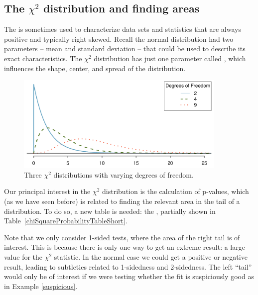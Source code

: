 \subsection{The $\chi^2$ distribution and finding areas}

The  is sometimes used to characterize data sets and statistics that are always positive and typically right skewed. Recall the normal distribution had two parameters -- mean and standard deviation -- that could be used to describe its exact characteristics. The $\chi^2$ distribution has just one parameter called , which influences the shape, center, and spread of the distribution.


\begin{figure}%
\centering
\includegraphics[width=0.9\textwidth]{ch_inference_for_props/figures/chiSquareDistributionWithInceasingDF/chiSquareDistributionWithInceasingDF}
\caption{Three $\chi^2$ distributions with varying degrees of freedom.}
\label{chiSquareDistributionWithInceasingDF}
\end{figure}


Our principal interest in the $\chi^2$ distribution is the calculation of p-values, which (as we have seen before) is related to finding the relevant area in the tail of a distribution. To do so, a new table is needed: the , partially shown in Table~\ref{chiSquareProbabilityTableShort}.

Note that we only consider 1-sided tests, where the area of the right tail is of interest. This is because there is only one way to get an extreme result: a large value for the $\chi^2$ statistic. In the normal case we could get a positive or negative result, leading to subtleties related to 1-sidedness and 2-sidedness. The left ``tail'' would only be of interest if we were testing whether the fit is suspiciously good as in Example \ref{suspicious}.

